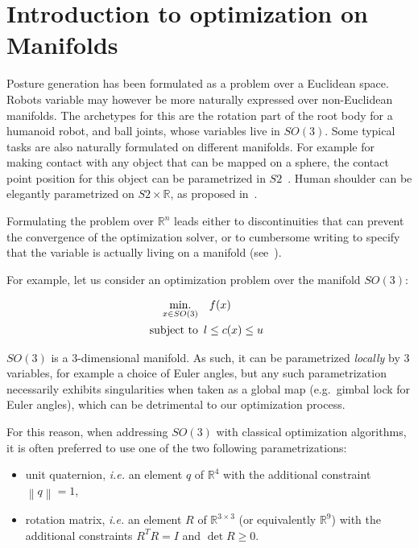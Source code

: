 \section{Introduction to optimization on Manifolds}
\label{sec:introduction_to_optimization_on_manifolds}

Posture generation has been formulated as a problem over a Euclidean space.
Robots variable may however be more naturally expressed over non-Euclidean manifolds.
The archetypes for this are the rotation part of the root body for a humanoid robot, and ball joints, whose variables live in $SO(3)$.
Some typical tasks are also naturally formulated on different manifolds.
For example for making contact with any object that can be mapped on a sphere, the contact point position for this object can be parametrized in $S2$~\cite{escande:icra:2016}.
Human shoulder can be elegantly parametrized on $S2\times\mathbb{R}$, as proposed in~\cite{baerlocher}.

Formulating the problem over $\mathbb{R}^n$ leads either to discontinuities that can prevent the convergence of the optimization solver, or to cumbersome writing to specify that the variable is actually living on a manifold (see~\cite{bouyarmane:humanoids:2012}).

For example, let us consider an optimization problem over the manifold $SO(3)$:

\begin{align}
\label{eq:pb_on_SO3}
  \operatorname*{min.}_{x \in SO(3)} & \quad f(x)\\
  \text{subject to}&
  \begin{array}{lr}
    l \leq c(x) \leq u \nonumber
  \end{array}
\end{align}

$SO(3)$ is a 3-dimensional manifold.
As such, it can be parametrized \emph{locally} by $3$ variables, for example a choice of Euler angles, but any such parametrization necessarily exhibits singularities when taken as a global map (e.g.\ gimbal lock for Euler angles), which can be detrimental to our optimization process.

For this reason, when addressing $SO(3)$ with classical optimization algorithms, it is often preferred to use one of the two following parametrizations:
\begin{itemize}
    \item unit quaternion, \emph{i.e.} an element $q$ of $\mathbb{R}^4$ with the additional constraint $\left\|q\right\| = 1$,
    \item rotation matrix, \emph{i.e.} an element $R$ of $\mathbb{R}^{3 \times 3}$ (or equivalently $\mathbb{R}^9$) with the additional constraints $R^T R = I$ and $\det{R} \geq 0$.
\end{itemize}

